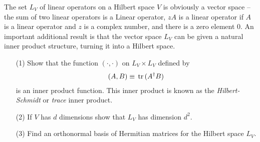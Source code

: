 \documentclass[en]{sol-man}
\begin{document}
\begin{exe}
    The set $L_V$ of linear operators on a Hilbert space $V$ is obviously a vector space -- the sum of two linear operators is a Linear operator, $zA$ is a linear operator if $A$ is a linear operator and $z$ is a complex number, and there is a zero element $0$. An important additional result is that the vector space $L_V$ can be given a natural inner product structure, turning it into a Hilbert space.
    \begin{itemize}
        \item[(1)] Show that the function $(\cdot,\cdot)$ on $L_V\times L_V$ defined by
        \begin{align}
            (A,B)\equiv\,\mathrm{tr}\,(A^{\dagger}B)
        \end{align}
        is an inner product function. This inner product is known as the \emph{Hilbert-Schmidt} or \emph{trace} inner product.
        \item[(2)] If $V$ has $d$ dimensions show that $L_V$ has dimension $d^2$.
        \item[(3)] Find an orthonormal basis of Hermitian matrices for the Hilbert space $L_V$.
    \end{itemize}
\end{exe}
\end{document}
